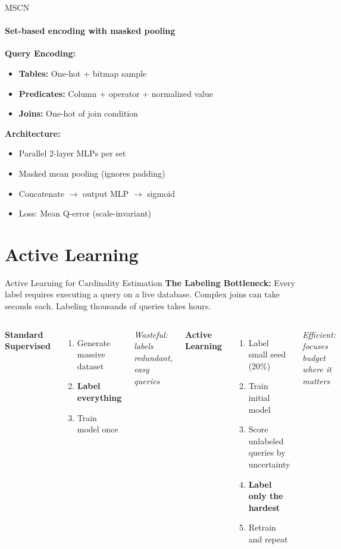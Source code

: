 \documentclass[aspectratio=169]{beamer}
\begin{document}
	\begin{frame}{MSCN}
		\framesubtitle{Set-based encoding with masked pooling}
		\large
		\textbf{Query Encoding:}
		\normalsize
		\begin{itemize}
			\item \textbf{Tables:} One-hot + bitmap sample
			\item \textbf{Predicates:} Column + operator + normalized value
			\item \textbf{Joins:} One-hot of join condition
		\end{itemize}
		
		\vspace{0.5cm}
		\large
		\textbf{Architecture:}
		\normalsize
		\begin{itemize}
			\item Parallel 2-layer MLPs per set
			\item Masked mean pooling (ignores padding)
			\item Concatenate $\rightarrow$ output MLP $\rightarrow$ sigmoid
			\item Loss: Mean Q-error (scale-invariant)
		\end{itemize}
	\end{frame}
	
	\section{Active Learning}
	
	\begin{frame}{Active Learning for Cardinality Estimation}
		\textbf{The Labeling Bottleneck:} Every label requires executing a query on a live database. Complex joins can take seconds each. Labeling thousands of queries takes hours.
		
		\vspace{0.3cm}
		
		\begin{columns}[T]
			\textbf{Standard Supervised}
			\begin{enumerate}
				\item Generate massive dataset
				\item \textbf{Label everything}
				\item Train model once 
			\end{enumerate}
			\textit{Wasteful: labels redundant, easy queries}
			
			\textbf{Active Learning}
			\begin{enumerate}
				\item Label small seed (20\%)
				\item Train initial model
				\item Score unlabeled queries by uncertainty
				\item \textbf{Label only the hardest}
				\item Retrain and repeat
			\end{enumerate}
			\textit{Efficient: focuses budget where it matters}
		\end{columns}
	\end{frame}
	
\end{document}
